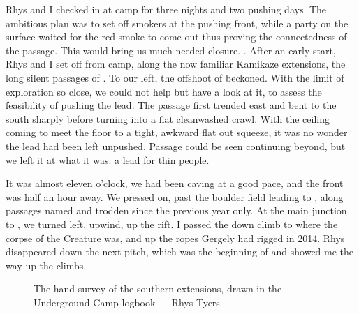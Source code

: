 Rhys and I checked in at camp  for three nights and two pushing days. The ambitious plan was to set off smokers at the pushing front, while a party on the surface waited for the red smoke to come out thus proving the connectedness of the passage. This would bring us much needed closure.
	. 
After an early start, Rhys and I set off  from camp, along the now familiar Kamikaze extensions, the long silent passages of . To our left, the offshoot of  beckoned. With the limit of exploration so close, we could not help but have a look at it, to assess the feasibility of pushing the lead. The passage first trended east and bent to the south sharply before turning into a flat cleanwashed crawl. With the ceiling coming to meet the floor to a tight, awkward flat out squeeze, it was no wonder the lead had been left unpushed. Passage could be seen continuing beyond, but we left it at what it was: a lead for thin people. 

It was almost eleven o'clock, we had been caving at a good pace, and the front was half an hour away. We pressed on, past the boulder field leading to , along passages named and trodden since the previous year only. At the main junction to , we turned left, upwind, up the rift. I passed the down climb to  where the corpse of the Creature was, and up the ropes Gergely had rigged in 2014. Rhys disappeared down the next pitch, which was the beginning of  and showed me the way up the climbs. 

\begin{figure}[t!]
\checkoddpage \ifoddpage \forcerectofloat \else \forceversofloat \fi
\centering
{}
\caption{The hand survey of the southern extensions, drawn in the Underground Camp logbook --- Rhys Tyers}
\label{Notebook}
\end{figure}

